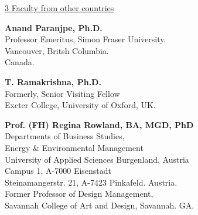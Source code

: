 \centerline{\underline{3 Faculty from other countries}}

\textbf{Anand Paranjpe, Ph.D.}\\ 
Professor Emeritus, Simon Fraser University.\\ 
Vancouver, Britsh Columbia.\\ 
Canada.
\medskip
 
\textbf{T. Ramakrishna, Ph.D.}\\ 
Formerly, Senior Visiting Fellow\\
Exeter College, University of Oxford, UK.
\medskip

\textbf{Prof. (FH) Regina Rowland, BA, MGD, PhD}\\ 
Departments of Business Studies,\\ 
Energy \& Environmental Management\\
University of Applied Sciences Burgenland, Austria\\
Campus 1, A-7000 Eisenstadt\\
Steinamangerstr. 21, A-7423 Pinkafeld. Austria.\\
Former Professor of Design Management,\\ 
Savannah College of Art and Design, Savannah. GA.

